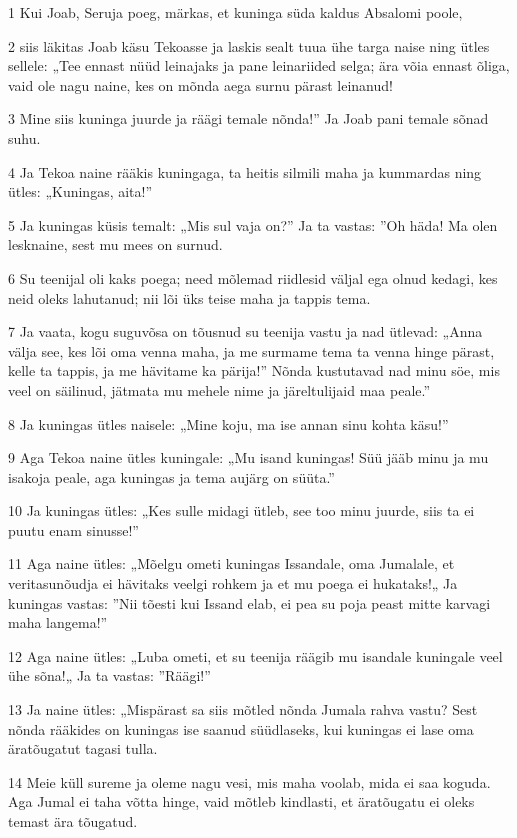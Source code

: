 \par 1 Kui Joab, Seruja poeg, märkas, et kuninga süda kaldus Absalomi poole,
\par 2 siis läkitas Joab käsu Tekoasse ja laskis sealt tuua ühe targa naise ning ütles sellele: „Tee ennast nüüd leinajaks ja pane leinariided selga; ära võia ennast õliga, vaid ole nagu naine, kes on mõnda aega surnu pärast leinanud!
\par 3 Mine siis kuninga juurde ja räägi temale nõnda!” Ja Joab pani temale sõnad suhu.
\par 4 Ja Tekoa naine rääkis kuningaga, ta heitis silmili maha ja kummardas ning ütles: „Kuningas, aita!”
\par 5 Ja kuningas küsis temalt: „Mis sul vaja on?” Ja ta vastas: ”Oh häda! Ma olen lesknaine, sest mu mees on surnud.
\par 6 Su teenijal oli kaks poega; need mõlemad riidlesid väljal ega olnud kedagi, kes neid oleks lahutanud; nii lõi üks teise maha ja tappis tema.
\par 7 Ja vaata, kogu suguvõsa on tõusnud su teenija vastu ja nad ütlevad: „Anna välja see, kes lõi oma venna maha, ja me surmame tema ta venna hinge pärast, kelle ta tappis, ja me hävitame ka pärija!” Nõnda kustutavad nad minu söe, mis veel on säilinud, jätmata mu mehele nime ja järeltulijaid maa peale.”
\par 8 Ja kuningas ütles naisele: „Mine koju, ma ise annan sinu kohta käsu!”
\par 9 Aga Tekoa naine ütles kuningale: „Mu isand kuningas! Süü jääb minu ja mu isakoja peale, aga kuningas ja tema aujärg on süüta.”
\par 10 Ja kuningas ütles: „Kes sulle midagi ütleb, see too minu juurde, siis ta ei puutu enam sinusse!”
\par 11 Aga naine ütles: „Mõelgu ometi kuningas Issandale, oma Jumalale, et veritasunõudja ei hävitaks veelgi rohkem ja et mu poega ei hukataks!„ Ja kuningas vastas: ”Nii tõesti kui Issand elab, ei pea su poja peast mitte karvagi maha langema!”
\par 12 Aga naine ütles: „Luba ometi, et su teenija räägib mu isandale kuningale veel ühe sõna!„ Ja ta vastas: ”Räägi!”
\par 13 Ja naine ütles: „Mispärast sa siis mõtled nõnda Jumala rahva vastu? Sest nõnda rääkides on kuningas ise saanud süüdlaseks, kui kuningas ei lase oma äratõugatut tagasi tulla.
\par 14 Meie küll sureme ja oleme nagu vesi, mis maha voolab, mida ei saa koguda. Aga Jumal ei taha võtta hinge, vaid mõtleb kindlasti, et äratõugatu ei oleks temast ära tõugatud.
